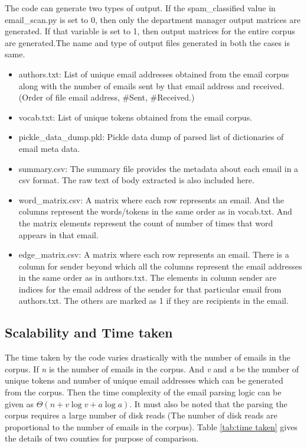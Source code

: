 \documentclass[fleqn]{MJDArticle}
\begin{document}
The code can generate two types of output. If the spam\_classified value in email\_scan.py is set to 0, then only the department manager output matrices are generated. If that variable is set to 1, then output matrices for the entire corpus are generated.The name and type of output files generated in both the cases is same. 
\begin{itemize}
\item authors.txt:  List of unique email addresses obtained from the email corpus along with the number of emails sent by that email address and received. (Order of file email address, \#Sent, \#Received.)
\item vocab.txt: List of unique tokens obtained from the email corpus.
\item pickle\_data\_dump.pkl: Pickle data dump of parsed list of dictionaries of email meta data.
\item summary.csv: The summary file provides the metadata about each email in a csv format. The raw text of body extracted is also included here. 
\item word\_matrix.csv: A matrix where each row represents an email. And the columns represent the words/tokens in the same order as in vocab.txt. And the matrix elements represent the count of number of times that word appears in that email.
\item edge\_matrix.csv: A matrix where each row represents an email. There is a column for sender beyond which all the columns represent the email addresses in the same order as in authors.txt. The elements in column sender are indices for the email address of the sender for that particular email from authors.txt. The others are marked as 1 if they are recipients in the email.
\end{itemize}
\subsection{Scalability and Time taken}
The time taken by the code varies drastically with the number of emails in the corpus. If \textit{n} is the number of emails in the corpus. And \textit{v} and \textit{a} be the number of unique tokens  and number of unique email addresses which can be generated from the corpus. Then the time complexity of the email parsing logic can be given as $\Theta(n + v\log{}v + a\log{}a)$. It must also be noted that the parsing the corpus requires a large number of disk reads (The number of disk reads are proportional to the number of emails in the corpus). Table \ref{tab:time taken} gives the details of two counties for purpose of comparison.
\end{document}
